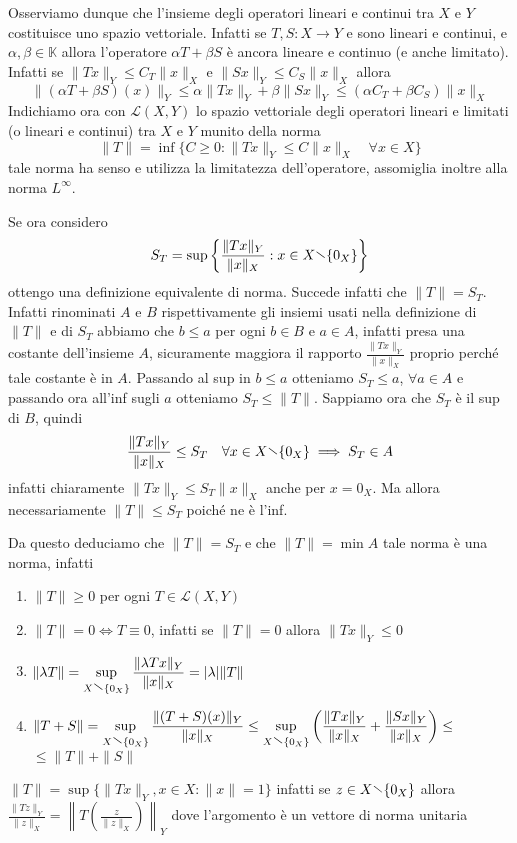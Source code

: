 Osserviamo dunque che l'insieme degli operatori lineari e continui tra \(X\)  e
\(Y\)  costituisce uno spazio vettoriale. Infatti se \(T, S : X \to Y\) e sono
lineari e continui, e \(\alpha, \beta \in \mathbb{K}\) allora l'operatore
\(\alpha T + \beta S\) è ancora lineare e continuo (e anche limitato). Infatti
se \(\|Tx\|_Y \le C_T\|x\|_X\) e \(\|Sx\|_Y \le C_S\|x\|_X\) allora
\[
  \|(\alpha T + \beta S){(x)}\|_Y \le \alpha\|Tx\|_Y + \beta\|Sx\|_Y \le
  (\alpha C_T + \beta C_S)\|x\|_X
\]
Indichiamo ora con \(\mathcal{L}{(X, Y)}\) lo spazio vettoriale degli operatori
lineari e limitati (o lineari e continui) tra \(X\) e \(Y\) munito della norma
\begin{equation}\label{eq:opnorm_inf}
    \|T\| = \inf \{C \ge 0: \|Tx\|_Y \le C\|x\|_X \quad \forall x \in X\}
\end{equation}
tale norma ha senso e utilizza la limitatezza dell'operatore, assomiglia inoltre
alla norma \(L^{\infty}\).

Se ora considero 
\[
    S_T = \sup \left\{ \frac{\|Tx\|_Y}{\|x\|_X} : x \in X \sminus \{0_X\} \right\}
\]
ottengo una definizione equivalente di norma. Succede infatti che \(\|T\| =
S_T\). Infatti rinominati \(A\) e \(B\) rispettivamente gli insiemi usati nella
definizione di \(\|T\|\) e di \(S_T\) abbiamo che \(b \le a\) per ogni \(b \in
B\) e \(a \in A\), infatti presa una costante dell'insieme \(A\), sicuramente
maggiora il rapporto \(\frac{\|Tx\|_Y}{\|x\|_X}\) proprio perché tale costante è
in \(A\). Passando al sup in \(b \le a\) otteniamo \(S_T \le a\), \(\forall a
\in A\) e passando ora all'inf sugli \(a\) otteniamo \(S_T \le \|T\|\). Sappiamo
ora che \(S_T\) è il sup di \(B\), quindi 
\[
    \frac{\|Tx\|_Y}{\|x\|_X} \le S_T \quad \forall x \in X \sminus \{0_X\}
    \implies S_T \in A
\]
infatti chiaramente \(\|Tx\|_Y \le S_T \|x\|_X\) anche per \(x = 0_X\). Ma
allora necessariamente \(\|T\| \le S_T\) poiché ne è l'inf.

Da questo deduciamo che \(\|T\| = S_T\) e che \(\|T\| = \min A\) 
tale norma è una norma, infatti
\begin{enumerate}[label = \arabic*.]
    \item \(\|T\| \ge 0\) per ogni \(T \in \mathcal{L}{(X, Y)}\) 
    \item \(\|T\| = 0 \iff T \equiv 0\), infatti se \(\|T\| =  0\) allora
        \(\|Tx\|_Y \le 0\) 
    \item \(\displaystyle \|\lambda T\| = \sup_{X \sminus \{0_X\}}  \frac{\|\lambda T x\|_Y}{\|x\|_X}
        = |\lambda|\|T\| \) 
    \item \(\displaystyle\|T+S\| = \sup_{X \sminus \{0_X\} }
        \frac{\|{(T+S)}{(x)}\|_Y}{\|x\|_X} \le \sup_{X \sminus \{0_X\} } {\left(
        \frac{\|Tx\|_Y}{\|x\|_X} + \frac{\|Sx\|_Y}{\|x\|_X}\right)}\le  \) \\\(\le
        \|T\|+\|S\| \) 
\end{enumerate}
\begin{remark}
    \(\|T\| = \sup \{\|Tx\|_Y, x \in X: \|x\|=1\} \) infatti se \(z \in X
    \sminus \{0_X\} \) allora \(\displaystyle \frac{\|Tz\|_Y}{\|z\|_X} = \left\|
    T {\left( \frac{z}{\|z\|_X} \right)} \right\|_Y\) dove l'argomento è un
    vettore di norma unitaria
\end{remark}

